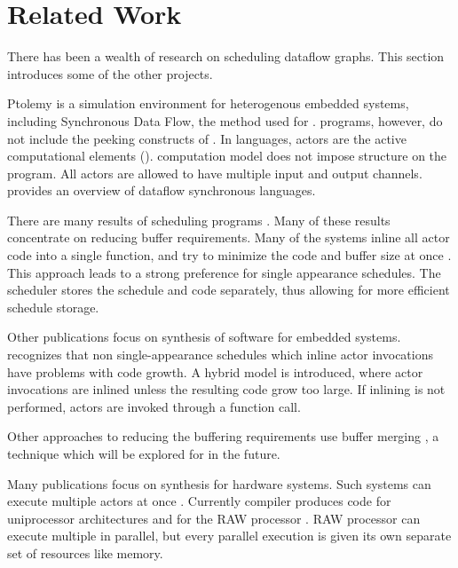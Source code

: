 \section{Related Work}
\label{chpt:related}

There has been a wealth of research on scheduling dataflow graphs.
This section introduces some of the other projects.

Ptolemy \cite{ptolemyoverview} is a simulation environment for
heterogenous embedded systems, including Synchronous Data Flow,
the method used for {\StreamIt}. {\SDF} programs, however, do not
include the peeking constructs of {\StreamIt}.  In {\SDF} languages,
actors are the active computational elements ({\filters}).  {\SDF}
computation model does not impose structure on the program.  All
actors are allowed to have multiple input and output channels.
\cite{benveniste93dataflow} provides an overview of dataflow
synchronous languages.

There are many results of scheduling {\SDF} programs
\cite{leesdf}. Many of these results concentrate on reducing buffer
requirements. Many of the systems inline all actor code into a single
function, and try to minimize the code and buffer size at once
\cite{bhattacharyya99synthesis}.  This approach leads to a strong
preference for single appearance schedules.  The {\StreamIt} scheduler
stores the schedule and {\filter} code separately, thus allowing for
more efficient schedule storage.

Other publications focus on synthesis of software for embedded
systems. \cite{bhat1999x1} recognizes that non single-appearance
schedules which inline actor invocations have problems with code
growth.  A hybrid model is introduced, where actor invocations are
inlined unless the resulting code grow too large. If inlining is
not performed, actors are invoked through a function call.

Other approaches to reducing the buffering requirements use buffer
merging \cite{murthy99buffer}, a technique which will be explored for
{\StreamIt} in the future.

Many publications focus on synthesis for hardware systems.  Such
systems can execute multiple actors at once
\cite{govindarajan-minimizing}.  Currently {\StreamIt} compiler
produces code for uniprocessor architectures \cite{streamittech2}
and for the RAW processor \cite{gordo-thesis}.  RAW processor can
execute multiple {\filters} in parallel, but every parallel
execution is given its own separate set of resources like memory.

